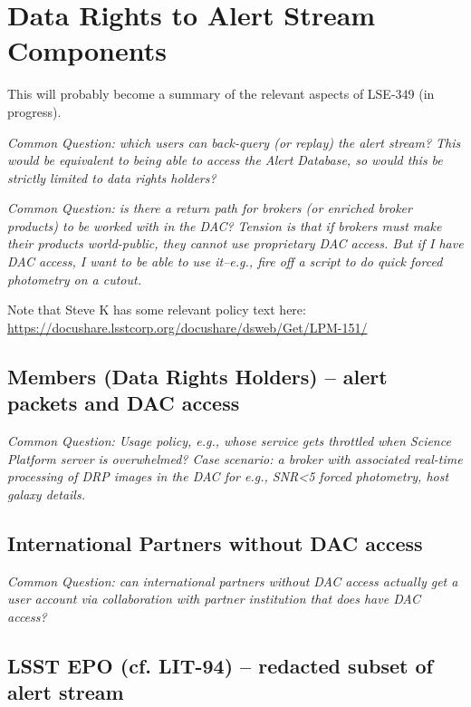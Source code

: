 \section{Data Rights to Alert Stream Components}\label{sec:data_rights}



This will probably become a summary of the relevant aspects of LSE-349 (in progress). 

{\it Common Question: which users can back-query (or replay) the alert stream? This would be equivalent to being able to access the Alert Database, so would this be strictly limited to data rights holders?}

{\it Common Question: is there a return path for brokers (or enriched broker products) to be worked with in the DAC?  Tension is that if brokers must make their products world-public, they cannot use proprietary DAC access.  But if I have DAC access, I want to be able to use it--e.g., fire off a script to do quick forced photometry on a cutout.}

Note that Steve K has some relevant policy text here:
\url{https://docushare.lsstcorp.org/docushare/dsweb/Get/LPM-151/}


\subsection{Members (Data Rights Holders) -- alert packets and DAC access}

{\it Common Question: Usage policy, e.g., whose service gets throttled when Science Platform server is overwhelmed? Case scenario: a broker with associated real-time processing of DRP images in the DAC for e.g., SNR<5 forced photometry, host galaxy details.}

\subsection{International Partners without DAC access}

{\it Common Question: can international partners without DAC access actually get a user account via collaboration with partner institution that does have DAC access?}

\subsection{LSST EPO (cf. LIT-94) -- redacted subset of alert stream}


